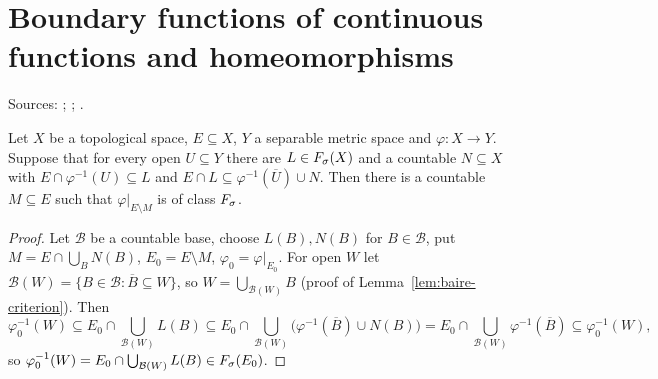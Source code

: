 \section{Boundary functions of continuous functions and homeomorphisms}\label{sec:bf}
Sources: \cite[\S5, Lemma 15, Theorem 5]{Diss}; \cite[Theorems 1--3]{JMM}; \cite[remark after Corollary 4]{MMJ}.

\begin{lemma}\label{lem:th-lemma15}
Let $X$ be a topological space, $E\subseteq X$, $Y$ a separable metric space and $\varphi:X\to Y$. Suppose that for
every open $U\subseteq Y$ there are $L\in F_\sigma(X)$ and a countable $N\subseteq X$ with
$E\cap\varphi^{-1}(U)\subseteq L$ and $E\cap L\subseteq\varphi^{-1}(\overline U)\cup N$. Then there is a countable
$M\subseteq E$ such that $\varphi|_{E\setminus M}$ is of class $F_\sigma$.
\end{lemma}
\begin{proof}
Let $\mathcal B$ be a countable base, choose $L(B),N(B)$ for $B\in\mathcal B$, put $M=E\cap\bigcup_BN(B)$,
$E_0=E\setminus M$, $\varphi_0=\varphi|_{E_0}$. For open $W$ let $\mathcal B(W)=\{B\in\mathcal B:\overline B\subseteq W\}$,
so $W=\bigcup_{\mathcal B(W)}B$ (proof of Lemma~\ref{lem:baire-criterion}). Then
\[
\varphi_0^{-1}(W)\subseteq E_0\cap\bigcup_{\mathcal B(W)}L(B)\subseteq
E_0\cap\bigcup_{\mathcal B(W)}\bigl(\varphi^{-1}(\overline B)\cup N(B)\bigr)=E_0\cap\bigcup_{\mathcal B(W)}\varphi^{-1}(\overline B)
\subseteq\varphi_0^{-1}(W),
\]
so $\varphi_0^{-1}(W)=E_0\cap\bigcup_{\mathcal B(W)}L(B)\in F_\sigma(E_0)$.
\end{proof}

